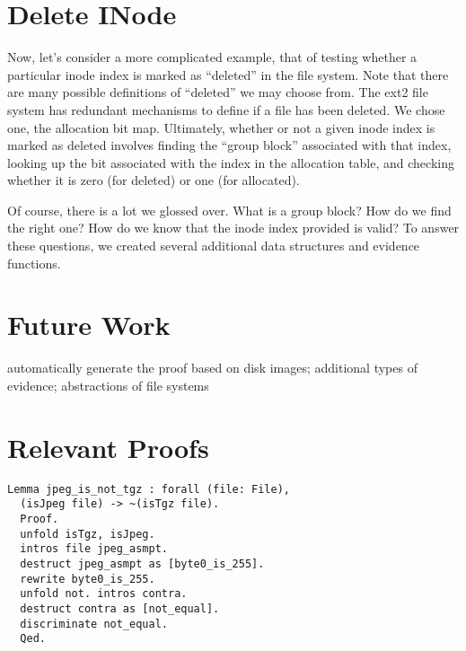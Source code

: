 \documentclass[nocopyrightspace]{sigplanconf}
\begin{document}

\section{Delete INode}

Now, let's consider a more complicated example, that of testing whether a
particular inode index is marked as ``deleted'' in the file system. Note that
there are many possible definitions of ``deleted'' we may choose from. The
ext2 file system has redundant mechanisms to define if a file has been
deleted. We chose one, the allocation bit map. Ultimately, whether or not a
given inode index is marked as deleted involves finding the ``group block''
associated with that index, looking up the bit associated with the index in
the allocation table, and checking whether it is zero (for deleted) or one
(for allocated).

Of course, there is a lot we glossed over. What is a group block? How do we
find the right one? How do we know that the inode index provided is valid? To
answer these questions, we created several additional data structures and
evidence functions.

\section{Future Work}

automatically generate the proof based on disk images; additional types of
evidence; abstractions of file systems


\appendix
\section{Relevant Proofs}

\begin{lstlisting}
Lemma jpeg_is_not_tgz : forall (file: File),
  (isJpeg file) -> ~(isTgz file).
  Proof.
  unfold isTgz, isJpeg.
  intros file jpeg_asmpt.
  destruct jpeg_asmpt as [byte0_is_255].
  rewrite byte0_is_255.
  unfold not. intros contra.
  destruct contra as [not_equal].
  discriminate not_equal.
  Qed.
\end{lstlisting}
\end{document}
